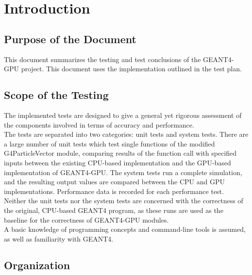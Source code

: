 \documentclass[12pt]{article}
\newcommand{\todo}[1]{\textcolor{red}{[TODO: #1]}} \else
\newcommand{\authornote}[3]{} \newcommand{\todo}[1]{} \fi
\newcommand{\ds}[1]{\authornote{blue}{DS}{#1}}
\newcommand{\mmp}[1]{\authornote{green}{MP}{#1}}
\begin{document}
\ds{Your table is in the wrong place for this heading. You might want to add some text in before the table (referencing it) to avoid an empty, floating heading.}
\mmp{Added text to fix floating table issue}

\section{Introduction}\label{Introduction}
\subsection{Purpose of the Document}
This document summarizes the testing and test conclusions of the GEANT4-GPU project. This document uses the implementation outlined in the test plan.

\subsection{Scope of the Testing}
The implemented tests are designed to give a general yet rigorous assessment of the components involved in terms of accuracy and performance.\\

The tests are separated into two categories: unit tests and system tests. There are a large number of unit tests which test single functions of the modified G4ParticleVector module, comparing results of the function call with specified inputs between the existing CPU-based implementation and the GPU-based implementation of GEANT4-GPU. The system tests run a complete simulation, and the resulting output values are compared between the CPU and GPU implementations. Performance data is recorded for each performance test.\\

Neither the unit tests nor the system tests are concerned with the correctness of the original, CPU-based GEANT4 program, as these runs are used as the baseline for the correctness of GEANT4-GPU modules.\\

A basic knowledge of programming concepts and command-line tools is assumed, as well as familiarity with GEANT4.

\subsection{Organization}
\ds{Use refs for your section/figure/table numbering. That way they'll be auto-generated.\\}
\mmp{Added refs for section}
\end{document}
